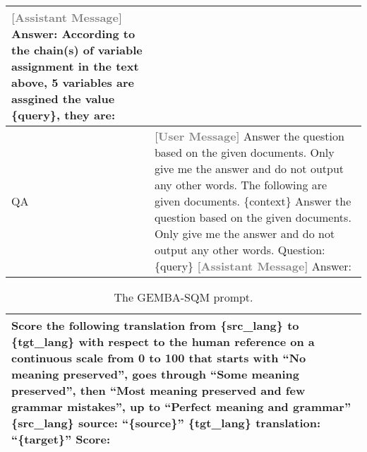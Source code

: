 \begin{table*}
\begin{tabularx}{\textwidth}{l|X}
    \textbf{\textcolor{gray}{[Assistant Message]}}\newline
    Answer: According to the chain(s) of variable assignment in the text above, 5 variables are assgined the value \{query\}, they are: \\
    \midrule
    QA & \textbf{\textcolor{gray}{[User Message]}}\newline
    Answer the question based on the given documents. Only give me the answer and do not output any other words.\newline\newline
    The following are given documents.\newline\newline
    \{context\}\newline\newline
    Answer the question based on the given documents. Only give me the answer and do not output any other words.\newline\newline
    Question: \{query\}\newline
    \textbf{\textcolor{gray}{[Assistant Message]}}\newline
    Answer:\\
    \bottomrule
    \end{tabularx}
\end{table*}

\begin{table*}[ht]
    \caption{The GEMBA-SQM prompt.}
    \label{tab:gemba_sqm}
    \vskip 0.15in
    \centering
    \begin{tabularx}{0.95\textwidth}{X}
    \toprule
    Score the following translation from \{src\_lang\} to \{tgt\_lang\} with respect to the human reference on a continuous scale from 0 to 100 that starts with ``No meaning preserved'', goes through ``Some meaning preserved'', then ``Most meaning preserved and few grammar mistakes'', up to ``Perfect meaning and grammar''\newline
    \newline
    \{src\_lang\} source: ``\{source\}''\newline
    \{tgt\_lang\} translation: ``\{target\}''\newline
    Score:\\
    \bottomrule
    \end{tabularx}
\end{table*}

